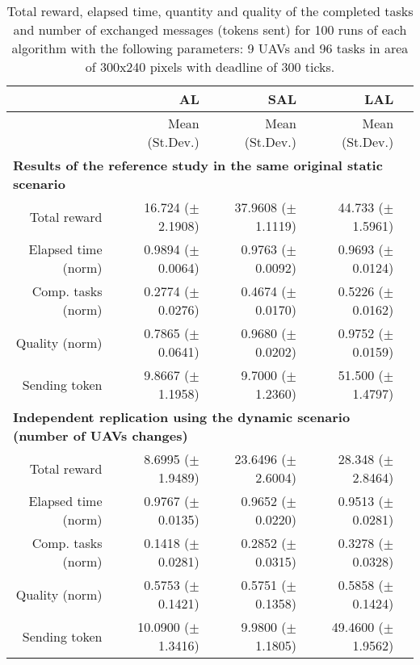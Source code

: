 \begin{table}%
	\small
	\fontsize{6}{6}\selectfont
	\centering
	\caption{Total reward, elapsed time, quantity and quality of the completed tasks and number of exchanged messages (tokens sent) for 100 runs of each algorithm with the following parameters: 9 UAVs and 96 tasks in area of 300x240 pixels with deadline of 300 ticks.}
	\label{table:table01}
	
	\begin{tabular}{rrrrr} \hline
		& AL
		& SAL
		& LAL \\ \hline 
		
		& Mean (St.Dev.)  & Mean (St.Dev.)  & Mean (St.Dev.)  \\ [1ex]
		
		\multicolumn{5}{l}{\textbf{Results of the reference study in the same original static scenario}} \\
	Total reward           & 16.724   ($\pm$2.1908)  & 37.9608  ($\pm$1.1119) & 44.733  ($\pm$1.5961)   \\
	Elapsed time (norm)    & 0.9894   ($\pm$0.0064)  &  0.9763  ($\pm$0.0092) & 0.9693  ($\pm$0.0124)    \\ 
	Comp. tasks (norm)     & 0.2774   ($\pm$0.0276)  &  0.4674  ($\pm$0.0170) & 0.5226  ($\pm$0.0162)    \\ 
	Quality (norm)         & 0.7865   ($\pm$0.0641)  &  0.9680  ($\pm$0.0202) & 0.9752  ($\pm$0.0159)   \\ 
	Sending token          &  9.8667  ($\pm$1.1958)  &  9.7000  ($\pm$1.2360) & 51.500 ($\pm$1.4797)   \\ [1ex]
		
		\multicolumn{5}{l}{\textbf{Independent replication using the dynamic scenario (number of UAVs changes)}} \\
	Total reward           & 8.6995  ($\pm$1.9489)  & 23.6496 ($\pm$2.6004) &  28.348  ($\pm$2.8464)  \\
	Elapsed time (norm)    & 0.9767  ($\pm$0.0135)  & 0.9652  ($\pm$0.0220) &  0.9513  ($\pm$0.0281)  \\ 
	Comp. tasks (norm)     & 0.1418  ($\pm$0.0281)  & 0.2852  ($\pm$0.0315) &  0.3278  ($\pm$0.0328)  \\ 
	Quality (norm)         & 0.5753  ($\pm$0.1421)  & 0.5751  ($\pm$0.1358) &  0.5858  ($\pm$0.1424)  \\ 
	Sending token          & 10.0900 ($\pm$1.3416)  & 9.9800  ($\pm$1.1805) &  49.4600 ($\pm$1.9562)  \\ [1ex]

		\hline
	\end{tabular}
\end{table} 




